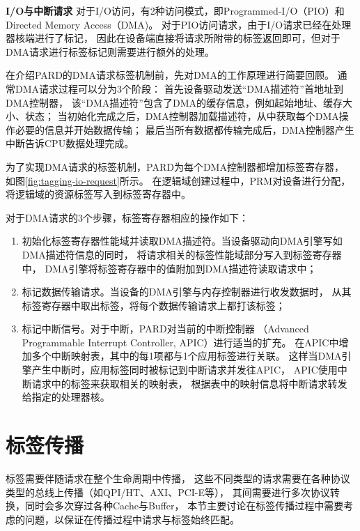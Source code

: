 \textbf{I/O与中断请求}\quad
对于I/O访问，有2种访问模式，即Programmed-I/O（PIO）和Directed Memory Access（DMA)。
对于PIO访问请求，由于I/O请求已经在处理器核端进行了标记，
因此在设备端直接将请求所附带的标签返回即可，但对于DMA请求进行标签标记则需要进行额外的处理。

在介绍PARD的DMA请求标签机制前，先对DMA的工作原理进行简要回顾。
通常DMA请求过程可以分为3个阶段：
首先设备驱动发送``DMA描述符''首地址到DMA控制器，
该``DMA描述符''包含了DMA的缓存信息，例如起始地址、缓存大小、状态；
当初始化完成之后，DMA控制器加载描述符，从中获取每个DMA操作必要的信息并开始数据传输；
最后当所有数据都传输完成后，DMA控制器产生中断告诉CPU数据处理完成。

为了实现DMA请求的标签机制，PARD为每个DMA控制器都增加标签寄存器，
如图\ref{fig:tagging-io-request}所示。
在逻辑域创建过程中，PRM对设备进行分配，将逻辑域的资源标签写入到标签寄存器中。

对于DMA请求的3个步骤，标签寄存器相应的操作如下：

\begin{enumerate}[leftmargin=2\parindent, nolistsep, label=\arabic*）]
  \item 初始化标签寄存器性能域并读取DMA描述符。当设备驱动向DMA引擎写如DMA描述符信息的同时，
        将请求相关的标签性能域部分写入到标签寄存器中，
        DMA引擎将标签寄存器中的值附加到DMA描述符读取请求中；
  \item 标记数据传输请求。当设备的DMA引擎与内存控制器进行收发数据时，
        从其标签寄存器中取出标签，将每个数据传输请求上都打该标签；
  \item 标记中断信号。对于中断，PARD对当前的中断控制器
        （Advanced Programmable Interrupt Controller, APIC）进行适当的扩充。
        在APIC中增加多个中断映射表，其中的每1项都与1个应用标签进行关联。
        这样当DMA引擎产生中断时，应用标签同时被标记到中断请求并发往APIC，
        APIC使用中断请求中的标签来获取相关的映射表，
        根据表中的映射信息将中断请求转发给指定的处理器核。
\end{enumerate}


\section{标签传播}
\label{chap:labeladdrspace:propagation}

标签需要伴随请求在整个生命周期中传播，
这些不同类型的请求需要在各种协议类型的总线上传播（如QPI/HT、AXI、PCI-E等），
其间需要进行多次协议转换，同时会多次穿过各种Cache与Buffer，
本节主要讨论在标签传播过程中需要考虑的问题，以保证在传播过程中请求与标签始终匹配。

